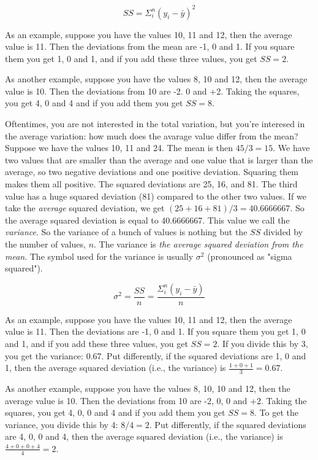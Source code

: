 \begin{equation}
SS = \Sigma_i^n (y_i-\bar{y})^2
\end{equation}

As an example, suppose you have the values 10, 11 and 12, then the average value is 11. Then the deviations from the mean are -1, 0 and 1. If you square them you get 1, 0 and 1, and if you add these three values, you get $SS=2$.

As another example, suppose you have the values 8, 10 and 12, then the average value is 10. Then the deviations from 10 are -2. 0 and +2. Taking the squares, you get 4, 0 and 4 and if you add them you get $SS=8$.

Oftentimes, you are not interested in the total variation, but you're interesed in the average variation: how much does the avarage value differ from the mean? Suppose we have the values 10, 11 and 24. The mean is then $45/3=15$. We have two values that are smaller than the average and one value that is larger than the average, so two negative deviations and one positive deviation. Squaring them makes them all positive. The squared deviations are 25, 16, and 81. The third value has a huge squared deviation (81) compared to the other two values. If we take the \textit{average} squared deviation, we get $(25+16+81)/3= 40.6666667$. So the average squared deviation is equal to 40.6666667. This value we call the \textit{variance}. So the variance of a bunch of values is nothing but the $SS$ divided by the number of values, $n$. The variance is \textit{the average squared deviation from the mean}. The symbol used for the variance is usually $\sigma^2$ (pronounced as "sigma squared").

\begin{equation}
\sigma^2 = \frac{SS}{n}= \frac{\Sigma_i^n (y_i-\bar{y})}{n}
\end{equation}


As an example, suppose you have the values 10, 11 and 12, then the average value is 11. Then the deviations are -1, 0 and 1. If you square them you get 1, 0 and 1, and if you add these three values, you get $SS=2$. If you divide this by 3, you get the variance: 0.67. Put differently, if the squared deviations are 1, 0 and 1, then the average squared deviation (i.e., the variance) is $\frac{1+0+1}{3}=0.67$.

As another example, suppose you have the values 8, 10, 10 and 12, then the average value is 10. Then the deviations from 10 are -2, 0, 0 and +2. Taking the squares, you get 4, 0, 0 and 4 and if you add them you get $SS=8$. To get the variance, you divide this by 4: $8/4=2$. Put differently, if the squared deviations are 4, 0, 0 and 4, then the average squared deviation (i.e., the variance) is $\frac{4+0+0+4}{4}=2$.

